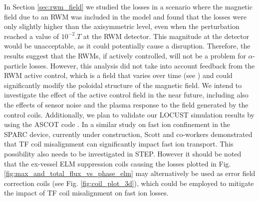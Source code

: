 \documentclass[10pt, a4paper, twoside]{article}
\begin{document}
In Section \ref{sec:rwm_field} we studied the losses in a scenario where the magnetic field due to an RWM was included in the model and found that the losses were only slightly higher than the axisymmetric level, even when the perturbation reached a value of $\si{10^{-2}.T}$ at the RWM detector. This magnitude at the detector would be unacceptable, as it could potentially cause a disruption. Therefore, the results suggest that the RWMs, if actively controlled, will not be a problem for $\alpha$-particle losses. However, this analysis did not take into account feedback from the RWM active control, which is a field that varies over time (see \cite{xia2023}) and could significantly modify the poloidal structure of the magnetic field. We intend to investigate the effect of the active control field in the near future, including also the effects of sensor noise and the plasma response to the field generated by the control coils. Additionally, we plan to validate our LOCUST simulation results by using the ASCOT code \cite{hirvijoki2014}. In a similar study on fast ion confinement in the SPARC device, currently under construction, Scott and co-workers \cite{Scott2020} demonstrated that TF coil misalignment can significantly impact fast ion transport. This possibility also needs to be investigated in STEP. However it should be noted that the ex-vessel ELM suppression coils causing the losses plotted in Fig. \ref{fig:max_and_total_flux_vs_phase_elm} may alternatively be used as error field correction coils (see Fig. \ref{fig:coil_plot_3d}), which could be employed to mitigate the impact of TF coil misalignment on fast ion losses. 

\end{document}
